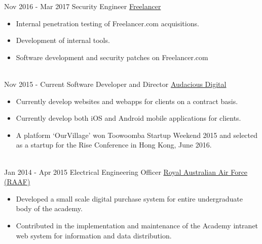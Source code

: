 \documentclass[letterpaper]{twentysecondcv} %
\begin{document}
\begin{twenty} %
\twentyitem
    	{Nov 2016 -}
		{Mar 2017}
        {Security Engineer}
        {\href{http://www.freelancer.com/}{Freelancer}}
        {}
        {\begin{itemize}
\item Internal penetration testing of Freelancer.com acquisitions.
\item Development of internal tools.
\item Software development and security patches on Freelancer.com
        \end{itemize}}
        \\
	\twentyitem
    	{Nov 2015 -}
		{Current}
        {Software Developer and Director}
        {\href{http://audaciousdigital.com.au/}{Audacious Digital}}
        {}
        {
        {\begin{itemize}
\item Currently develop websites and webapps for clients on a contract basis.
\item Currently develop both iOS and Android mobile applications for clients.
\item A platform `OurVillage' won Toowoomba Startup Weekend 2015 and selected as a startup for the Rise Conference in Hong Kong, June 2016.
    \end{itemize}}
        }
    \\   
    \twentyitem
   		{Jan 2014 -}
		{Apr 2015}
        {Electrical Engineering Officer}
        {\href{http://www.airforce.gov.au}{Royal Australian Air Force (RAAF)}}
        {}
        {
        {\begin{itemize}
\item Developed a small scale digital purchase system for entire undergraduate body of the academy.
\item Contributed in the implementation and maintenance of the Academy intranet web system for information and data distribution.
    \end{itemize}}
        }
     \\    
\end{twenty}
\end{document}
